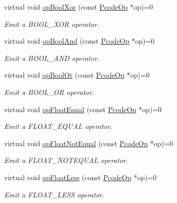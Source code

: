 \begin{DoxyCompactItemize}
virtual void \mbox{\hyperlink{class_print_language_afec915abc4e783221b53658b8fda0bf6}{op\+Bool\+Xor}} (const \mbox{\hyperlink{class_pcode_op}{Pcode\+Op}} $\ast$op)=0
\begin{DoxyCompactList}\small\item\em Emit a B\+O\+O\+L\+\_\+\+X\+OR operator. \end{DoxyCompactList}\item 
virtual void \mbox{\hyperlink{class_print_language_a43e714904628588b0dca6b08213b5c9c}{op\+Bool\+And}} (const \mbox{\hyperlink{class_pcode_op}{Pcode\+Op}} $\ast$op)=0
\begin{DoxyCompactList}\small\item\em Emit a B\+O\+O\+L\+\_\+\+A\+ND operator. \end{DoxyCompactList}\item 
virtual void \mbox{\hyperlink{class_print_language_ab15187334bfeb10b3a3ca9a63e4278a2}{op\+Bool\+Or}} (const \mbox{\hyperlink{class_pcode_op}{Pcode\+Op}} $\ast$op)=0
\begin{DoxyCompactList}\small\item\em Emit a B\+O\+O\+L\+\_\+\+OR operator. \end{DoxyCompactList}\item 
virtual void \mbox{\hyperlink{class_print_language_a9de53fd1d0e80e9d7e745126d14f4023}{op\+Float\+Equal}} (const \mbox{\hyperlink{class_pcode_op}{Pcode\+Op}} $\ast$op)=0
\begin{DoxyCompactList}\small\item\em Emit a F\+L\+O\+A\+T\+\_\+\+E\+Q\+U\+AL operator. \end{DoxyCompactList}\item 
virtual void \mbox{\hyperlink{class_print_language_ac689ee69b58dcfe142ff14b6ab753d06}{op\+Float\+Not\+Equal}} (const \mbox{\hyperlink{class_pcode_op}{Pcode\+Op}} $\ast$op)=0
\begin{DoxyCompactList}\small\item\em Emit a F\+L\+O\+A\+T\+\_\+\+N\+O\+T\+E\+Q\+U\+AL operator. \end{DoxyCompactList}\item 
virtual void \mbox{\hyperlink{class_print_language_a2ea5d38b6215f83008aba64ae55371b1}{op\+Float\+Less}} (const \mbox{\hyperlink{class_pcode_op}{Pcode\+Op}} $\ast$op)=0
\begin{DoxyCompactList}\small\item\em Emit a F\+L\+O\+A\+T\+\_\+\+L\+E\+SS operator. \end{DoxyCompactList}\item 

\end{DoxyCompactItemize}
